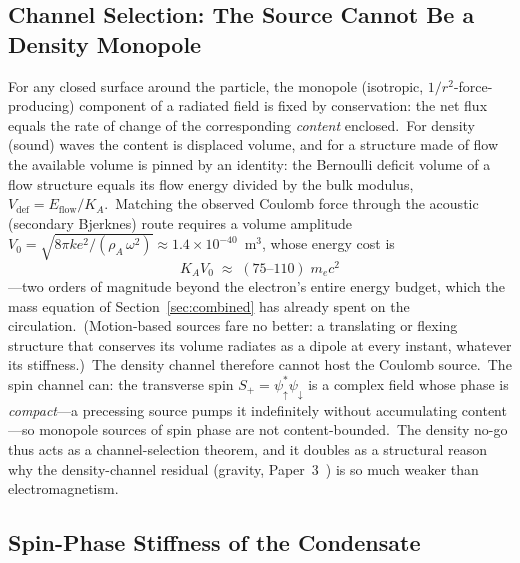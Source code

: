 \documentclass[12pt,letterpaper]{article}
\newcommand{\rhoa}{\rho_{\!A}}
\newcommand{\Ka}{K_{\!A}}
\begin{document}
\subsection{Channel Selection: The Source Cannot Be a Density Monopole}
\label{sec:channel-selection}

For any closed surface around the particle, the monopole (isotropic,
$1/r^2$-force-producing) component of a radiated field is fixed by
conservation: the net flux equals the rate of change of the corresponding
\emph{content} enclosed.\ For density (sound) waves the content is
displaced volume, and for a structure made of flow the available volume
is pinned by an identity: the Bernoulli deficit volume of a flow
structure equals its flow energy divided by the bulk modulus,
$V_{\mathrm{def}} = E_{\mathrm{flow}}/\Ka$.\ Matching the observed
Coulomb force through the acoustic (secondary Bjerknes) route
\cite{bjerknes1906} requires a volume amplitude
$V_0 = \sqrt{8\pi k e^2/(\rhoa\,\omega^2)} \approx 1.4\times10^{-40}$~m$^3$,
whose energy cost is
%
\begin{equation}
  \Ka V_0 \;\approx\; (75\text{--}110)\; m_e c^2
  \label{eq:density-nogo}
\end{equation}
%
---two orders of magnitude beyond the electron's entire energy budget,
which the mass equation of Section~\ref{sec:combined} has already spent
on the circulation.\ (Motion-based sources fare no better: a translating
or flexing structure that conserves its volume radiates as a dipole at
every instant, whatever its stiffness.)\ The density channel therefore
cannot host the Coulomb source.\ The spin channel can: the transverse
spin $S_+ = \psi_\uparrow^* \psi_\downarrow$ is a complex field whose
phase is \emph{compact}---a precessing source pumps it indefinitely
without accumulating content---so monopole sources of spin phase are not
content-bounded.\ The density no-go thus acts as a channel-selection
theorem, and it doubles as a structural reason why the density-channel
residual (gravity, Paper~3~\cite{otto-gravity}) is so much weaker than
electromagnetism.

\subsection{Spin-Phase Stiffness of the Condensate}
\label{sec:spin-stiffness}
\end{document}

